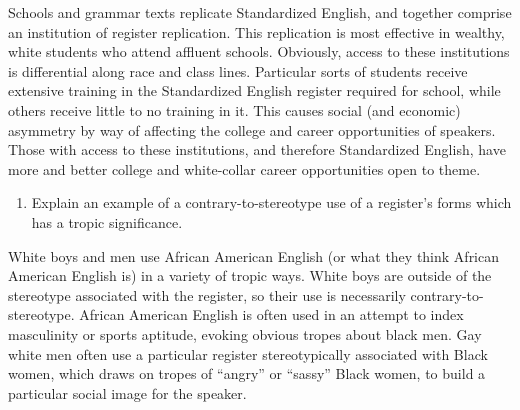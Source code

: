 \documentclass[doc,12pt]{apa6}
\providecommand{\tightlist}{%
  \setlength{\itemsep}{0pt}\setlength{\parskip}{0pt}}
\begin{document}
Schools and grammar texts replicate Standardized English, and together
comprise an institution of register replication. This replication is
most effective in wealthy, white students who attend affluent schools.
Obviously, access to these institutions is differential along race and
class lines. Particular sorts of students receive extensive training in
the Standardized English register required for school, while others
receive little to no training in it. This causes social (and economic)
asymmetry by way of affecting the college and career opportunities of
speakers. Those with access to these institutions, and therefore
Standardized English, have more and better college and white-collar
career opportunities open to theme.

\begin{enumerate}
\def\labelenumi{\arabic{enumi}.}
\setcounter{enumi}{11}
\tightlist
\item
  Explain an example of a contrary-to-stereotype use of a register's
  forms which has a tropic significance.
\end{enumerate}

White boys and men use African American English (or what they think
African American English is) in a variety of tropic ways. White boys are
outside of the stereotype associated with the register, so their use is
necessarily contrary-to-stereotype. African American English is often
used in an attempt to index masculinity or sports aptitude, evoking
obvious tropes about black men. Gay white men often use a particular
register stereotypically associated with Black women, which draws on
tropes of ``angry'' or ``sassy'' Black women, to build a particular
social image for the speaker.
\end{document}
